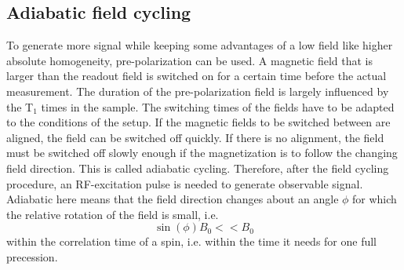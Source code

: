         \subsection{Adiabatic field cycling}
        To generate more signal while keeping some advantages of a low field like higher absolute homogeneity, pre-polarization can be used. A magnetic field that is larger than the readout field is switched on for a certain time before the actual measurement. The duration of the pre-polarization field is largely influenced by the T$_1$ times in the sample. The switching times of the fields have to be adapted to the conditions of the setup. If the magnetic fields to be switched between are aligned, the field can be switched off quickly. If there is no alignment, the field must be switched off slowly enough if the magnetization is to follow the changing field direction. This is called adiabatic cycling. Therefore, after the field cycling procedure, an RF-excitation pulse is needed to generate observable signal. Adiabatic here means that the field direction changes about an angle $\phi$ for which the relative rotation of the field is small, i.e. 
            \begin{equation}
                \sin(\phi) B_0 << B_0
            \end{equation}
            within the correlation time of a spin, i.e. within the time it needs for one full precession.

